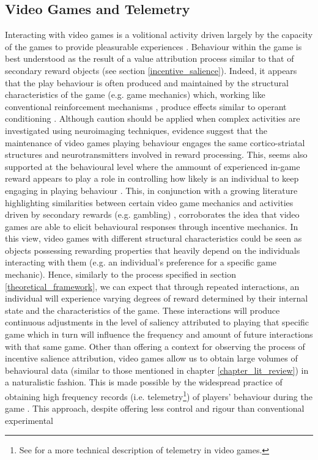 \subsection{Video Games and Telemetry}
\label{videogame_telemetries}
Interacting with video games is a volitional activity driven largely by the capacity of the games to provide pleasurable experiences \cite{boyle2012engagement}. Behaviour within the game is best understood as the result of a value attribution process similar to that of secondary reward objects (see section \ref{incentive_salience}). Indeed, it appears that the play behaviour is often produced and maintained by the structural characteristics of the game (e.g. game mechanics) \cite{king2010video} which, working like conventional reinforcement mechanisms \cite{chumbley2006affect,wang2011game,phillips2013videogame,avserivskis2017computational}, produce effects similar to operant conditioning \cite{skinner1965science}. Although caution should be applied when complex activities are investigated using neuroimaging techniques, evidence suggest that the maintenance of video games playing behaviour engages the same cortico-striatal structures \cite{hoeft2008gender,mathiak2011reward,cole2012interactivity,klasen2012neural,lorenz2015video,gleich2017functional} and neurotransmitters \cite{koepp1998evidence} involved in reward processing. This, seems also supported at the behavioural level where the ammount of experienced in-game reward appears to play a role in controlling how likely is an individual to keep engaging in playing behaviour \cite{agarwal2017quitting, steyvers2019joint}. This, in conjunction with a growing literature highlighting similarities between certain video game mechanics and activities driven by secondary rewards (e.g. gambling) \cite{king2010role,drummond2018video,zendle2018video}, corroborates the idea that video games are able to elicit behavioural responses through incentive mechanics. In this view, video games with different structural characteristics could be seen as objects possessing rewarding properties that heavily depend on the individuals interacting with them (e.g. an individual's preference for a specific game mechanic). Hence, similarly to the process specified in section \ref{theoretical_framework}, we can expect that through repeated interactions, an individual will experience varying degrees of reward determined by their internal state and the characteristics of the game. These interactions will produce continuous adjustments in the level of saliency attributed to playing that specific game which in turn will influence the frequency and amount of future interactions with that same game. Other than offering a context for observing the process of incentive salience attribution, video games allow us to obtain large volumes of behavioural data (similar to those mentioned in chapter \ref{chapter_lit_review}) in a naturalistic fashion. This is made possible by the widespread practice of obtaining high frequency records (i.e. telemetry\footnote{See \cite{el2016game} for a more technical description of telemetry in video games.}) of players' behaviour during the game \cite{drachen2015behavioral}. This approach, despite offering less control and rigour than conventional experimental 